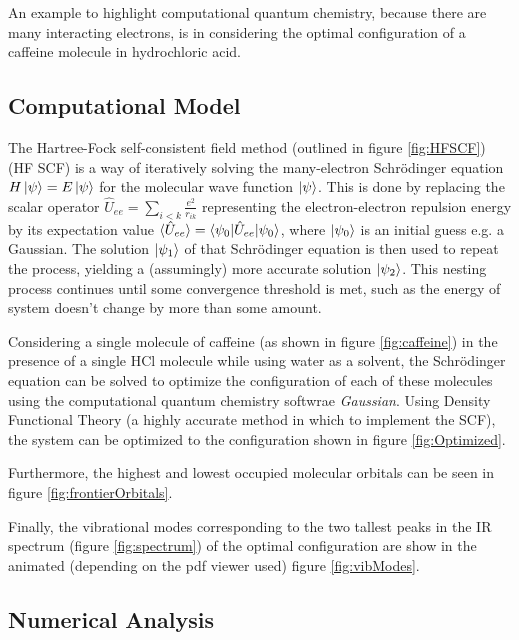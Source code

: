 \documentclass{report}
\begin{document}
            An example to highlight computational quantum chemistry, because there are many interacting electrons, is in considering the optimal configuration of a caffeine molecule in hydrochloric acid.

        \subsection{Computational Model}

            The Hartree-Fock self-consistent field method (outlined in figure \ref{fig:HFSCF}) (HF SCF) is a way of iteratively solving the many-electron Schr{\"o}dinger equation $H \ket{\psi} = E \ket{\psi}$ for the molecular wave function $\ket{\psi}$.  This is done by replacing the scalar operator $\hat{U}_{ee} = \sum_{i < k} \frac{e^2}{r_{ik}}$ representing the electron-electron repulsion energy by its expectation value $\braket{\hat{U}_{ee}} = \braket{\psi_0 | \hat{U}_{ee} | \psi_0}$, where $\ket{\psi_0}$ is an initial guess e.g. a Gaussian.  The solution $\ket{\psi_1}$ of that Schr{\"o}dinger equation is then used to repeat the process, yielding a (assumingly) more accurate solution $\ket{\psi_2}$.  This nesting process continues until some convergence threshold is met, such as the energy of system doesn't change by more than some amount.

            Considering a single molecule of caffeine (as shown in figure \ref{fig:caffeine}) in the presence of a single HCl molecule while using water as a solvent, the Schr{\"o}dinger equation can be solved to optimize the configuration of each of these molecules using the computational quantum chemistry softwrae \textit{Gaussian}.  Using Density Functional Theory (a highly accurate method in which to implement the SCF), the system can be optimized to the configuration shown in figure \ref{fig:Optimized}.  

            Furthermore, the highest and lowest occupied molecular orbitals can be seen in figure \ref{fig:frontierOrbitals}.

            Finally, the vibrational modes corresponding to the two tallest peaks in the IR spectrum (figure \ref{fig:spectrum}) of the optimal configuration are show in the animated (depending on the pdf viewer used) figure \ref{fig:vibModes}.

        \subsection{Numerical Analysis}
\end{document}
